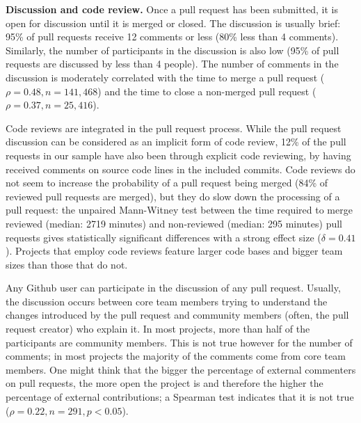 \documentclass{sig-alternate}
\begin{document}
\textbf{Discussion and code review.}
Once a pull request has been submitted, it is open for discussion until it is
merged or closed. The discussion is usually brief: 95\% of pull requests receive
12 comments or less (80\% less than 4 comments).
Similarly, the number of participants in the discussion is also low (95\% of
pull requests are discussed by less than 4 people).
The number of
comments in the discussion is moderately correlated with the time to merge a
pull request ($\rho = 0.48, n = 141,468$) and the time to close a non-merged
pull request ($\rho = 0.37, n = 25,416$). 

Code reviews are integrated in the pull request process. While the pull request
discussion can be considered as an implicit form of code review, 12\% of the
pull requests in our sample have also been through explicit code reviewing, by
having received comments on source code lines in the included commits. Code
reviews do not seem to increase the probability of a pull request being merged
(84\% of reviewed pull requests are merged), but they do slow down the
processing of a pull request: the unpaired Mann-Witney test between the time
required to merge reviewed (median: 2719 minutes) and non-reviewed (median: 295
minutes) pull requests gives statistically significant differences with a strong
effect size ($\delta = 0.41$). Projects that employ code reviews feature larger
code bases and bigger team sizes than those that do not.

Any Github user can participate in the discussion of any pull request. Usually,
the discussion occurs between core team members trying to understand the changes
introduced by the pull request and community members (often, the pull request
creator) who explain it.
In most projects, more than half of the participants are
community members. This is not true however for the number of comments; in most
projects the majority of the comments come from core team members. One might
think that the bigger the percentage of external commenters on pull requests,
the more open the project is and therefore the higher the percentage of
external contributions; a Spearman test indicates that it is not true ($\rho =
0.22, n = 291, p < 0.05$).

\noindent
{}
\end{document}
